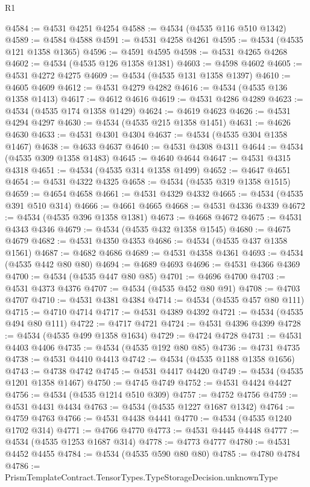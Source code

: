 \begin{lexlean}{R1}
\begin{coremodule}
@4584 := @4531 @4251 @4254
@4588 := @4534 (@4535 @116 @510 @1342)
@4589 := @4584 @4588
@4591 := @4531 @4258 @4261
@4595 := @4534 (@4535 @121 @1358 @1365)
@4596 := @4591 @4595
@4598 := @4531 @4265 @4268
@4602 := @4534 (@4535 @126 @1358 @1381)
@4603 := @4598 @4602
@4605 := @4531 @4272 @4275
@4609 := @4534 (@4535 @131 @1358 @1397)
@4610 := @4605 @4609
@4612 := @4531 @4279 @4282
@4616 := @4534 (@4535 @136 @1358 @1413)
@4617 := @4612 @4616
@4619 := @4531 @4286 @4289
@4623 := @4534 (@4535 @174 @1358 @1429)
@4624 := @4619 @4623
@4626 := @4531 @4294 @4297
@4630 := @4534 (@4535 @215 @1358 @1451)
@4631 := @4626 @4630
@4633 := @4531 @4301 @4304
@4637 := @4534 (@4535 @304 @1358 @1467)
@4638 := @4633 @4637
@4640 := @4531 @4308 @4311
@4644 := @4534 (@4535 @309 @1358 @1483)
@4645 := @4640 @4644
@4647 := @4531 @4315 @4318
@4651 := @4534 (@4535 @314 @1358 @1499)
@4652 := @4647 @4651
@4654 := @4531 @4322 @4325
@4658 := @4534 (@4535 @319 @1358 @1515)
@4659 := @4654 @4658
@4661 := @4531 @4329 @4332
@4665 := @4534 (@4535 @391 @510 @314)
@4666 := @4661 @4665
@4668 := @4531 @4336 @4339
@4672 := @4534 (@4535 @396 @1358 @1381)
@4673 := @4668 @4672
@4675 := @4531 @4343 @4346
@4679 := @4534 (@4535 @432 @1358 @1545)
@4680 := @4675 @4679
@4682 := @4531 @4350 @4353
@4686 := @4534 (@4535 @437 @1358 @1561)
@4687 := @4682 @4686
@4689 := @4531 @4358 @4361
@4693 := @4534 (@4535 @442 @80 @80)
@4694 := @4689 @4693
@4696 := @4531 @4366 @4369
@4700 := @4534 (@4535 @447 @80 @85)
@4701 := @4696 @4700
@4703 := @4531 @4373 @4376
@4707 := @4534 (@4535 @452 @80 @91)
@4708 := @4703 @4707
@4710 := @4531 @4381 @4384
@4714 := @4534 (@4535 @457 @80 @111)
@4715 := @4710 @4714
@4717 := @4531 @4389 @4392
@4721 := @4534 (@4535 @494 @80 @111)
@4722 := @4717 @4721
@4724 := @4531 @4396 @4399
@4728 := @4534 (@4535 @499 @1358 @1634)
@4729 := @4724 @4728
@4731 := @4531 @4403 @4406
@4735 := @4534 (@4535 @192 @80 @85)
@4736 := @4731 @4735
@4738 := @4531 @4410 @4413
@4742 := @4534 (@4535 @1188 @1358 @1656)
@4743 := @4738 @4742
@4745 := @4531 @4417 @4420
@4749 := @4534 (@4535 @1201 @1358 @1467)
@4750 := @4745 @4749
@4752 := @4531 @4424 @4427
@4756 := @4534 (@4535 @1214 @510 @309)
@4757 := @4752 @4756
@4759 := @4531 @4431 @4434
@4763 := @4534 (@4535 @1227 @1687 @1342)
@4764 := @4759 @4763
@4766 := @4531 @4438 @4441
@4770 := @4534 (@4535 @1240 @1702 @314)
@4771 := @4766 @4770
@4773 := @4531 @4445 @4448
@4777 := @4534 (@4535 @1253 @1687 @314)
@4778 := @4773 @4777
@4780 := @4531 @4452 @4455
@4784 := @4534 (@4535 @590 @80 @80)
@4785 := @4780 @4784
@4786 := PrismTemplateContract.TensorTypes.TypeStorageDecision.unknownType

\end{coremodule}
\end{lexlean}
